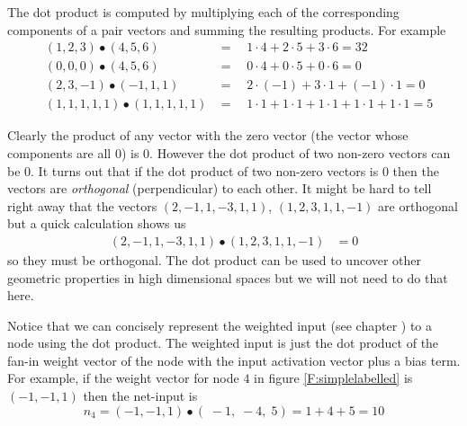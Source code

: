    The dot product is computed by multiplying each of the corresponding 
components of a pair vectors and summing the resulting products. For example
\begin{eqnarray*}
&(1,2,3)  \bullet  (4,5,6)& = \quad 1 \cdot 4 + 2 \cdot 5 + 3 \cdot 6 = 32   \\
&(0,0,0)  \bullet  (4,5,6)& = \quad 0 \cdot 4 + 0 \cdot 5 + 0 \cdot 6 = 0    \\
&(2,3,-1) \bullet (-1,1,1)& = \quad 2 \cdot (-1) + 3 \cdot 1 + (-1) \cdot 1 = 0 \\
 &(1,1,1,1,1) \bullet (1,1,1,1,1)& = \quad  
          1 \cdot 1 + 1 \cdot 1 +  1 \cdot 1 + 1 \cdot 1 + 1 \cdot 1 = 5
\end{eqnarray*}

   Clearly the product of any vector with the zero vector (the vector whose
components are all $0$) is $0$. However the dot product of two non-zero 
vectors can be $0$. It turns out that if the dot product of two non-zero 
vectors is $0$ then the vectors are {\em orthogonal} (perpendicular) to each 
other. It might be hard to tell right away that the vectors 
$(2,-1,1,-3,1,1)$, $(1,2,3,1,1,-1)$ are orthogonal but a quick calculation 
shows us
\begin{eqnarray*}
 (2,-1,1,-3,1,1) \bullet (1,2,3,1,1,-1)& = 0
\end{eqnarray*}
so they must be orthogonal. The dot product can be used to uncover other
geometric properties in high dimensional spaces but we will not need to do
that here.

 Notice that we can concisely represent the weighted input (see chapter )
to a node using the dot product. The weighted input is just the dot product of
the fan-in weight vector of the node with the input activation vector plus a
bias term. For example, if the weight vector for node $4$ in figure \ref{F:simplelabelled} is 
$(-1,-1,1)$ then the net-input is
\begin{equation*}
n_4 = (-1,-1,1) \bullet (\; -1,\; -4,\; 5) = 1 + 4 +5 = 10
\end{equation*}



